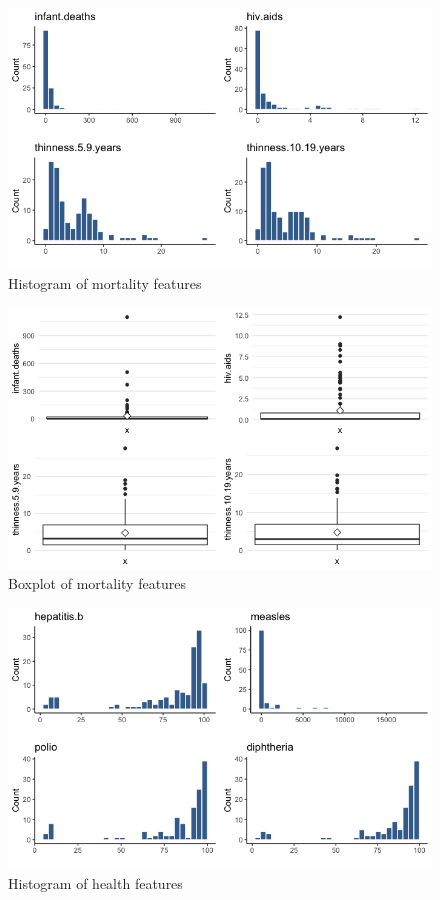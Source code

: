 
\begin{figure}[H]
	\centering
	\includegraphics{figures/eda/histogram_mortality_features.png}
	\caption{Histogram of mortality features}
	\label{fig:histogram_mortality_features}
\end{figure}

\begin{figure}[H]
	\centering
	\includegraphics{figures/eda/boxplot_mortality_features.png}
	\caption{Boxplot of mortality features}
	\label{fig:boxplot_mortality_features}
\end{figure}


\begin{figure}[H]
	\centering
	\includegraphics{figures/eda/histogram_health_features.png}
	\caption{Histogram of health features}
	\label{fig:histogram_health_features}
\end{figure}

